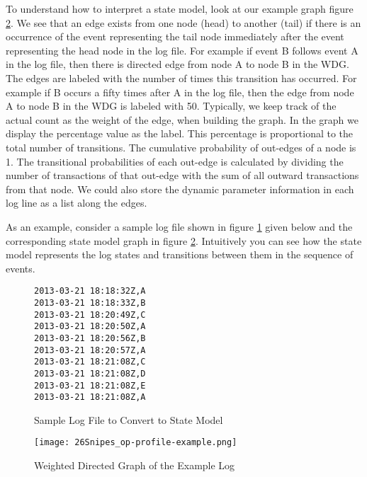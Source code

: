 To understand how to interpret a state model, look at our example graph figure \ref{op-profile-example}.  We see that an edge exists from one node (head) to another (tail) if there is an occurrence of the event representing the tail node immediately after the event representing the head node in the  log file. For example if event B follows event A in the log file, then there is directed edge from node A to node B in the WDG. The edges are labeled with the number of times this transition has occurred.  For example if B occurs a fifty times after A in the log file, then the edge from node A to node B in the WDG is labeled with 50. Typically, we keep track of the actual count as the weight of the edge, when building the graph. In the graph we display the percentage value as the label. This percentage is proportional to the total number of transitions.  The cumulative probability of out-edges of a node is 1. The transitional probabilities of each out-edge is calculated by dividing the number of transactions of that out-edge with the sum of all outward transactions from that node. We could also store the dynamic parameter information in each log line as a list along the edges. 

As an example, consider a sample log file shown in figure \ref{samplelogfile} given below and the corresponding state model graph in figure \ref{op-profile-example}. Intuitively you can see how the state model represents the log states and transitions between them in the sequence of events.  

\begin{figure}
\hrulefill
\begin{verbatim}
2013-03-21 18:18:32Z,A
2013-03-21 18:18:33Z,B
2013-03-21 18:20:49Z,C
2013-03-21 18:20:50Z,A
2013-03-21 18:20:56Z,B
2013-03-21 18:20:57Z,A
2013-03-21 18:21:08Z,C
2013-03-21 18:21:08Z,D
2013-03-21 18:21:08Z,E
2013-03-21 18:21:08Z,A
\end{verbatim}
\hrulefill
\caption{Sample Log File to Convert to State Model}\label{samplelogfile}
\end{figure}

\begin{figure}[h]
  \centering
  \texttt{[image: 26Snipes\_op-profile-example.png]}
  \caption{Weighted Directed Graph of the Example Log}\label{op-profile-example}
\end{figure}






 
